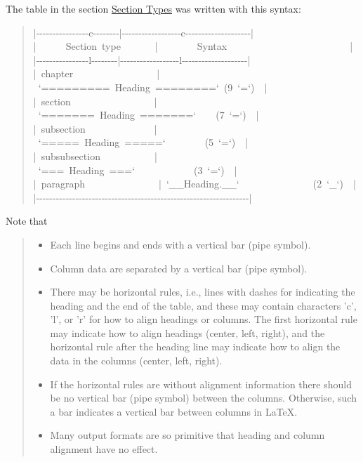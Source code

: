 \documentclass[a4paper]{article}
\begin{document}
The table in the section \hyperref[section-types]{Section Types} was written with this
syntax:
%
\begin{quote}{\ttfamily \raggedright \noindent
|-{}-{}-{}-{}-{}-{}-{}-{}-{}-{}-{}-{}-{}-{}-{}-c-{}-{}-{}-{}-{}-{}-{}-|-{}-{}-{}-{}-{}-{}-{}-{}-{}-{}-{}-{}-{}-{}-{}-{}-{}-c-{}-{}-{}-{}-{}-{}-{}-{}-{}-{}-{}-{}-{}-{}-{}-{}-{}-{}-{}-|\\
|~~~~~~Section~type~~~~~~~|~~~~~~~~Syntax~~~~~~~~~~~~~~~~~~~~~~~~~|\\
|-{}-{}-{}-{}-{}-{}-{}-{}-{}-{}-{}-{}-{}-{}-{}-l-{}-{}-{}-{}-{}-{}-{}-|-{}-{}-{}-{}-{}-{}-{}-{}-{}-{}-{}-{}-{}-{}-{}-{}-{}-l-{}-{}-{}-{}-{}-{}-{}-{}-{}-{}-{}-{}-{}-{}-{}-{}-{}-{}-{}-|\\
|~chapter~~~~~~~~~~~~~~~~~|~`=========~Heading~========`~(9~`=`)~~|\\
|~section~~~~~~~~~~~~~~~~~|~`=======~Heading~=======`~~~~(7~`=`)~~|\\
|~subsection~~~~~~~~~~~~~~|~`=====~Heading~=====`~~~~~~~~(5~`=`)~~|\\
|~subsubsection~~~~~~~~~~~|~`===~Heading~===`~~~~~~~~~~~~(3~`=`)~~|\\
|~paragraph~~~~~~~~~~~~~~~|~`\_\_Heading.\_\_`~~~~~~~~~~~~~~~(2~`\_`)~~|\\
|-{}-{}-{}-{}-{}-{}-{}-{}-{}-{}-{}-{}-{}-{}-{}-{}-{}-{}-{}-{}-{}-{}-{}-{}-{}-{}-{}-{}-{}-{}-{}-{}-{}-{}-{}-{}-{}-{}-{}-{}-{}-{}-{}-{}-{}-{}-{}-{}-{}-{}-{}-{}-{}-{}-{}-{}-{}-{}-{}-{}-{}-{}-{}-{}-|
}
\end{quote}

Note that
%
\begin{quote}
%
\begin{itemize}

\item Each line begins and ends with a vertical bar (pipe symbol).

\item Column data are separated by a vertical bar (pipe symbol).

\item There may be horizontal rules, i.e., lines with dashes for
indicating the heading and the end of the table, and these may
contain characters 'c', 'l', or 'r' for how to align headings or
columns. The first horizontal rule may indicate how to align
headings (center, left, right), and the horizontal rule after the
heading line may indicate how to align the data in the columns
(center, left, right).

\item If the horizontal rules are without alignment information there should
be no vertical bar (pipe symbol) between the columns. Otherwise, such
a bar indicates a vertical bar between columns in LaTeX.

\item Many output formats are so primitive that heading and column alignment
have no effect.

\end{itemize}

\end{quote}
\end{document}
